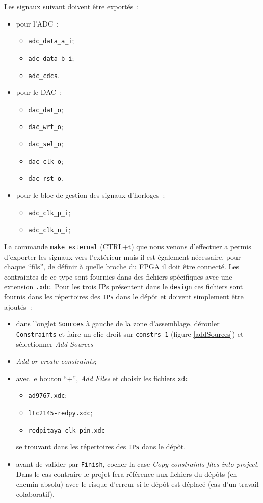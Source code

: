 \documentclass[12pt,oneside]{article}
\begin{document}
Les signaux suivant doivent \^etre export\'es~:
\begin{itemize}
\item pour l'ADC~: 
	\begin{itemize}
	\item {\tt adc\_data\_a\_i};
	\item {\tt adc\_data\_b\_i};
	\item {\tt adc\_cdcs}.
	\end{itemize}
\item pour le DAC~:
	\begin{itemize}
	\item {\tt dac\_dat\_o};
	\item {\tt dac\_wrt\_o};
	\item {\tt dac\_sel\_o};
	\item {\tt dac\_clk\_o};
	\item {\tt dac\_rst\_o}.
	\end{itemize}
\item pour le bloc de gestion des signaux d'horloges~:
	\begin{itemize}
	\item {\tt adc\_clk\_p\_i};
	\item {\tt adc\_clk\_n\_i};
	\end{itemize}
\end{itemize}

La commande {\tt make external} (CTRL+t) que nous venons d'effectuer
a permis d'exporter les signaux vers
l'ext\'erieur mais il est \'egalement n\'ecessaire, pour chaque ``fils'', de
d\'efinir \`a quelle broche du FPGA il doit \^etre connect\'e.
Les contraintes de ce type sont fournies dans des fichiers sp\'ecifiques avec une extension
{\tt .xdc}. Pour les trois IPs pr\'esentent dans le {\tt design} ces fichiers
sont fournis dans les r\'epertoires des {\tt IPs} dans le d\'ep\^ot et doivent
simplement \^etre ajout\'es~:
\begin{itemize}
\item dans l'onglet {\tt Sources} \`a gauche de la zone d'assemblage,
d\'erouler {\tt Constraints} et faire un clic-droit sur {\tt constrs\_1}
(figure \ref{addSources}) et s\'electionner {\em Add Sources}
\item {\em Add or create constraints};
\item avec le bouton ``+'', {\em Add Files} et choisir les fichiers {\tt xdc}
	\begin{itemize}
	\item {\tt ad9767.xdc};
	\item {\tt ltc2145-redpy.xdc};
	\item {\tt redpitaya\_clk\_pin.xdc}
	\end{itemize}
	se trouvant dans les r\'epertoires des {\tt IPs} dans le d\'ep\^ot.
\item avant de valider par {\tt Finish}, cocher la case {\em Copy constraints
files into project}. Dans le cas contraire le projet fera r\'ef\'erence aux
fichiers du d\'ep\^ots (en chemin absolu) avec le risque d'erreur si le
d\'ep\^ot est d\'eplac\'e (cas d'un travail colaboratif).
\end{itemize}
\end{document}
